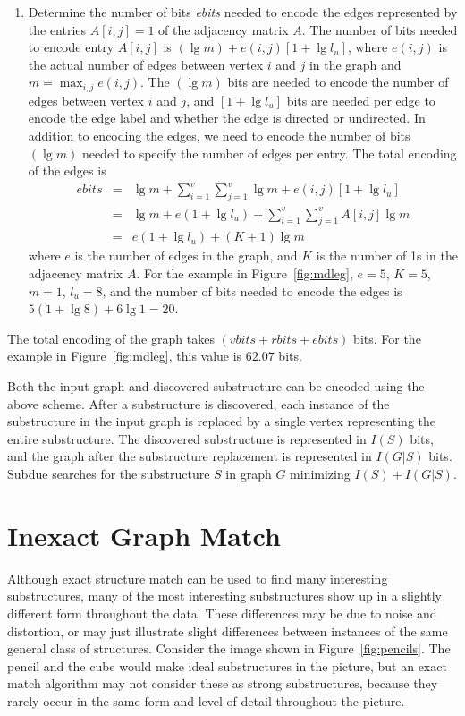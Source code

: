 \begin{enumerate}
\item Determine the number of bits {\em ebits} needed to encode the edges
represented by the entries $A[i,j]=1$ of the adjacency matrix $A$.  The
number of bits needed to encode entry $A[i,j]$ is $(\lg m) + e(i,j)[ 1 +
\lg l_u ]$, where $e(i,j)$ is the actual number of edges between vertex $i$
and $j$ in the graph and $m = \max_{i,j} e(i,j)$.  The $(\lg m)$ bits are
needed to encode the number of edges between vertex $i$ and $j$, and $[ 1 +
\lg l_u ]$ bits are needed per edge to encode the edge label and whether
the edge is directed or undirected.  In addition to encoding the edges, we
need to encode the number of bits $(\lg m)$ needed to specify the number of
edges per entry.  The total encoding of the edges is
\begin{eqnarray*}
ebits & = & \lg m + \sum_{i=1}^{v} \sum_{j=1}^{v} \lg m + e(i,j)[1+\lg l_u] \\
      & = & \lg m + e(1 + \lg l_u) + \sum_{i=1}^{v} \sum_{j=1}^{v}
              A[i,j] \lg m \\
      & = & e(1 + \lg l_u) + (K + 1) \lg m
\end{eqnarray*}
where $e$ is the number of edges in the graph, and $K$ is the number of 1s
in the adjacency matrix $A$.  For the example in Figure~\ref{fig:mdleg},
$e=5$, $K=5$, $m=1$, $l_u = 8$, and the number of bits needed to encode the
edges is $5(1 + \lg 8) + 6 \lg 1 = 20$.

\end{enumerate}

The total encoding of the graph takes $(vbits + rbits + ebits)$ bits.  For
the example in Figure~\ref{fig:mdleg}, this value is $62.07$ bits.

Both the input graph and discovered substructure can be encoded using the
above scheme.  After a substructure is discovered, each instance of the
substructure in the input graph is replaced by a single vertex representing
the entire substructure. The discovered substructure is represented in
$I(S)$ bits, and the graph after the substructure replacement is
represented in $I(G|S)$ bits.  {\sc Subdue} searches for the substructure
$S$ in graph $G$ minimizing $I(S)+I(G|S)$.

\section{Inexact Graph Match}
\label{s:gmatch}

Although exact structure match can be used to find many interesting
substructures, many of the most interesting substructures show up in a
slightly different form throughout the data.  These differences may be due
to noise and distortion, or may just illustrate slight differences between
instances of the same general class of structures.  Consider the image
shown in Figure~\ref{fig:pencils}.  The pencil and the cube would make
ideal substructures in the picture, but an exact match algorithm may not
consider these as strong substructures, because they rarely occur in the
same form and level of detail throughout the picture.

